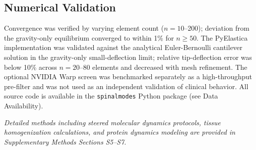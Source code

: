 \subsection{Numerical Validation}

Convergence was verified by varying element count ($n=10$--200); deviation from the gravity-only equilibrium converged to within 1\% for $n \geq 50$. The PyElastica implementation was validated against the analytical Euler-Bernoulli cantilever solution in the gravity-only small-deflection limit; relative tip-deflection error was below 10\% across $n=20$--80 elements and decreased with mesh refinement. The optional NVIDIA Warp screen was benchmarked separately as a high-throughput pre-filter and was not used as an independent validation of clinical behavior. All source code is available in the \texttt{spinalmodes} Python package (see Data Availability).

\textit{Detailed methods including steered molecular dynamics protocols, tissue homogenization calculations, and protein dynamics modeling are provided in Supplementary Methods Sections S5--S7.}
